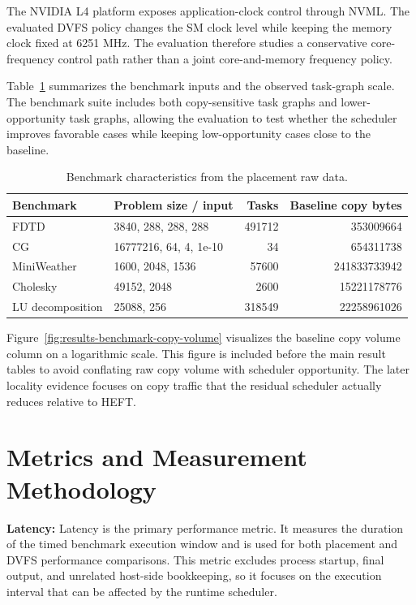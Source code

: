The NVIDIA L4 platform exposes application-clock control through NVML. The
evaluated DVFS policy changes the SM clock level while keeping the memory
clock fixed at 6251 MHz. The evaluation therefore studies a conservative
core-frequency control path rather than a joint core-and-memory frequency
policy.

Table~\ref{tab:results-benchmark-characteristics} summarizes the benchmark
inputs and the observed task-graph scale. The benchmark suite includes both
copy-sensitive task graphs and lower-opportunity task graphs, allowing the
evaluation to test whether the scheduler improves favorable cases while keeping
low-opportunity cases close to the baseline.

\begin{table}[!htbp]
\centering
\begingroup
\scriptsize
\setlength{\tabcolsep}{4pt}
\begin{tabular}{@{}llrr@{}}
\toprule
Benchmark & Problem size / input & Tasks & Baseline copy bytes \\
\midrule
FDTD & 3840, 288, 288, 288 & 491712 & 353009664 \\
CG & 16777216, 64, 4, 1e-10 & 34 & 654311738 \\
MiniWeather & 1600, 2048, 1536 & 57600 & 241833733942 \\
Cholesky & 49152, 2048 & 2600 & 15221178776 \\
LU decomposition & 25088, 256 & 318549 & 22258961026 \\
\bottomrule
\end{tabular}%
\endgroup
\caption{Benchmark characteristics from the placement raw data.}
\label{tab:results-benchmark-characteristics}
\end{table}

\figBenchmarkCopyVolume

Figure~\ref{fig:results-benchmark-copy-volume} visualizes the baseline copy
volume column on a logarithmic scale. This figure is included before the main
result tables to avoid conflating raw copy volume with scheduler opportunity.
The later locality evidence focuses on copy traffic that the residual
scheduler actually reduces relative to HEFT.

\section{Metrics and Measurement Methodology}
\label{sec:results-metrics}

\textbf{Latency:}
Latency is the primary performance metric. It measures the duration of the
timed benchmark execution window and is used for both placement and DVFS
performance comparisons. This metric excludes process startup, final output,
and unrelated host-side bookkeeping, so it focuses on the execution interval
that can be affected by the runtime scheduler.

